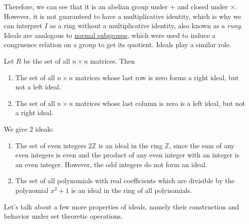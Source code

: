   Therefore, we can see that it is an abelian group under $+$ and closed under $\times$. However, it is not guaranteed to have a multiplicative identity, which is why we can interpret $I$ as a ring without a multiplicative identity, also known as a \textit{rung}. Ideals are analogous to \hyperref[def:normal_subgroup]{normal subgroups}, which were used to induce a congruence relation on a group to get its quotient. Ideals play a similar role. 

  \begin{example}
    \label{ex:matrix-with-last-row-of-zeros}
    Let $R$ be the set of all $n \times n$ matrices. Then 
    \begin{enumerate}
      \item The set of all $n \times n$ matrices whose last row is zero forms a right ideal, but not a left ideal.
      \item The set of all $n\times n$ matrices whose last column is zero is a left ideal, but not a right ideal. 
    \end{enumerate}
  \end{example}

  \begin{example}
    \label{ex:multiples-of-elements-are-an-ideal}
    We give 2 ideals: 
    \begin{enumerate}
      \item The set of even integers $2 \mathbb{Z}$ is an ideal in the ring $\mathbb{Z}$, since the sum of any even integers is even and the product of any even integer with an integer is an even integer. However, the odd integers do not form an ideal. 
      \item The set of all polynomials with real coefficients which are divisible by the polynomial $x^2 + 1$ is an ideal in the ring of all polynomials. 
    \end{enumerate}
  \end{example}

  Let's talk about a few more properties of ideals, namely their construction and behavior under set theoretic operations. 


